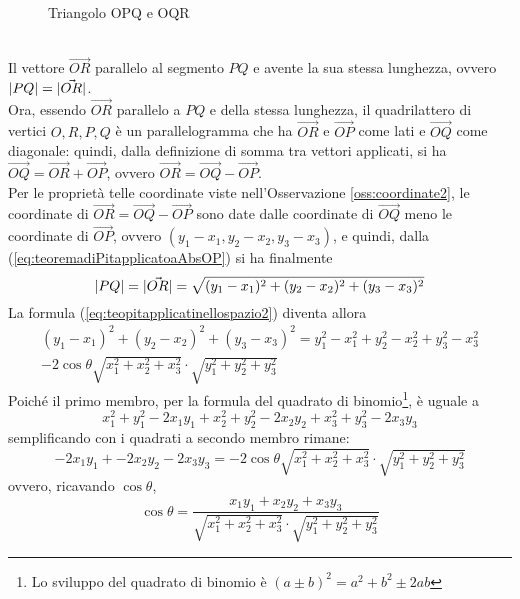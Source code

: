 \begin{figure}[ht!]
  \centering
  \resizebox{4cm}{!}{
      
    }
  \caption{Triangolo OPQ e OQR}
  \label{fig:triangoloOPQeOQR}
\end{figure}\\
Il vettore $\vec{OR}$ parallelo al segmento $PQ$ e avente la sua stessa lunghezza, ovvero $\lvert PQ\rvert=\lvert\vec{OR}\rvert$.\\
Ora, essendo $\vec{OR}$ parallelo a $PQ$ e della stessa lunghezza, il quadrilattero di vertici $O,R,P,Q$ è un parallelogramma che ha $\vec{OR}$ e $\vec{OP}$ come lati e $\vec{OQ}$ come diagonale: quindi, dalla definizione di somma tra vettori applicati, si ha $\vec{OQ}=\vec{OR}+\vec{OP}$, ovvero $\vec{OR}=\vec{OQ}-\vec{OP}$.\\
Per le proprietà telle coordinate viste nell'Osservazione \ref{oss:coordinate2}, le coordinate di $\vec{OR}=\vec{OQ}-\vec{OP}$ sono date dalle coordinate di $\vec{OQ}$ meno le coordinate di $\vec{OP}$, ovvero $(y_1-x_1,y_2-x_2,y_3-x_3)$, e quindi, dalla (\ref{eq:teoremadiPitapplicatoaAbsOP}) si ha finalmente
\begin{equation}
  \label{eq:teopitapplicatinellospazio3}
  \lvert PQ\rvert=\lvert\vec{OR}\rvert=\sqrt{(y_1-x_1)^2+(y_2-x_2)^2+(y_3-x_3)^2}
\end{equation}
La formula (\ref{eq:teopitapplicatinellospazio2}) diventa allora
\begin{equation}
  \label{eq:teopitapplicatinellospazio4}
  \begin{matrix}
    (y_1-x_1)^2+(y_2-x_2)^2+(y_3-x_3)^2=y^2_1-x^2_1+y^2_2-x^2_2+y^2_3-x^2_3\\
    -2\cos\theta\sqrt{x^2_1+x^2_2+x^2_3}\cdot\sqrt{y^2_1+y^2_2+y^2_3}
  \end{matrix}  
\end{equation}
Poiché il primo membro, per la formula del quadrato di binomio\footnote{Lo sviluppo del quadrato di binomio è $(a\pm{}b)^2=a^2+b^2\pm2ab$}, è uguale a
\begin{equation*}
  x^2_1+y^2_1-2x_1y_1+x^2_2+y^2_2-2x_2y_2+x^2_3+y^2_3-2x_3y_3
\end{equation*}
semplificando con i quadrati a secondo membro rimane:
\begin{equation}
  \label{eq:teopitapplicatinellospazio5}
  -2x_1y_1+-2x_2y_2-2x_3y_3=-2\cos\theta\sqrt{x^2_1+x^2_2+x^2_3}\cdot\sqrt{y^2_1+y^2_2+y^2_3}
\end{equation}
ovvero, ricavando $\cos\theta$,
\begin{equation}
  \label{eq:teopitapplicatinellospazio6}
  \cos\theta = \frac{x_1y_1+x_2y_2+x_3y_3}{\sqrt{x^2_1+x^2_2+x^2_3}\cdot\sqrt{y^2_1+y^2_2+y^2_3}}
\end{equation} 
